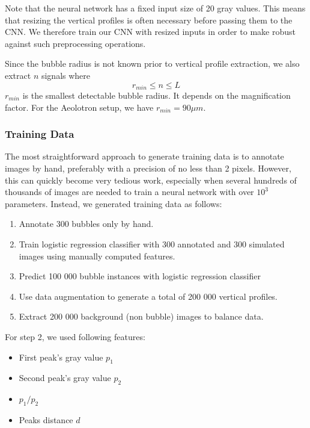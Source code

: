 	Note that the neural network has a fixed input size of 20 gray values. This means that resizing the vertical profiles is often necessary before passing them to the CNN. We therefore train our CNN with resized inputs in order to make robust against such preprocessing operations. 
	
	Since the bubble radius is not known prior to vertical profile extraction, we also extract $n$ signals where 
	\begin{equation}
		r_{min} \leq n \leq L
	\end{equation}
	$r_{min}$ is the smallest detectable bubble radius. It depends on the magnification factor. For the Aeolotron setup, we have $r_{min} = 90 \mu m$.

		\subsubsection{Training Data}
			The most straightforward approach to generate training data is to annotate images by hand, preferably with a precision of no less than 2 pixels. However, this can quickly become very tedious work, especially when several hundreds of thousands of images are needed to train a neural network with over $10^{3}$ parameters. Instead, we generated training data as follows:
			\begin{enumerate}
				\item Annotate 300 bubbles only by hand.
				\item Train logistic regression classifier with 300 annotated and 300 simulated images using manually computed features.
				\item Predict 100 000 bubble instances with logistic regression classifier
				\item Use data augmentation to generate a total of 200 000 vertical profiles. 				
				\item Extract 200 000 background (non bubble) images to balance data.
			\end{enumerate}
			
			For step 2, we used following features:
			\begin{itemize}
				\item First peak's gray value $p_1$
				\item Second peak's gray value $p_2$
				\item $p_1/p_2$
				\item Peaks distance $d$
			\end{itemize}
			
